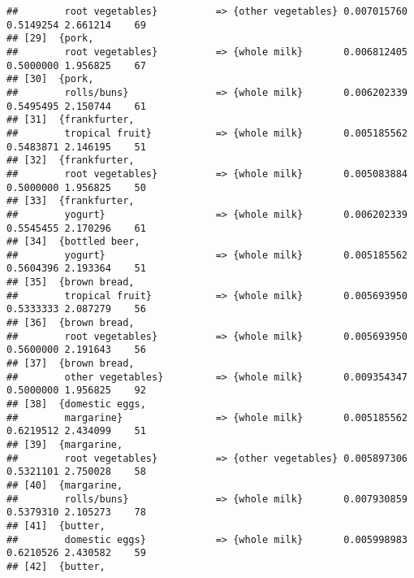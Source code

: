 \documentclass[]{article}
\begin{document}
\begin{verbatim}
##        root vegetables}          => {other vegetables} 0.007015760  0.5149254 2.661214    69
## [29]  {pork,                                                                                
##        root vegetables}          => {whole milk}       0.006812405  0.5000000 1.956825    67
## [30]  {pork,                                                                                
##        rolls/buns}               => {whole milk}       0.006202339  0.5495495 2.150744    61
## [31]  {frankfurter,                                                                         
##        tropical fruit}           => {whole milk}       0.005185562  0.5483871 2.146195    51
## [32]  {frankfurter,                                                                         
##        root vegetables}          => {whole milk}       0.005083884  0.5000000 1.956825    50
## [33]  {frankfurter,                                                                         
##        yogurt}                   => {whole milk}       0.006202339  0.5545455 2.170296    61
## [34]  {bottled beer,                                                                        
##        yogurt}                   => {whole milk}       0.005185562  0.5604396 2.193364    51
## [35]  {brown bread,                                                                         
##        tropical fruit}           => {whole milk}       0.005693950  0.5333333 2.087279    56
## [36]  {brown bread,                                                                         
##        root vegetables}          => {whole milk}       0.005693950  0.5600000 2.191643    56
## [37]  {brown bread,                                                                         
##        other vegetables}         => {whole milk}       0.009354347  0.5000000 1.956825    92
## [38]  {domestic eggs,                                                                       
##        margarine}                => {whole milk}       0.005185562  0.6219512 2.434099    51
## [39]  {margarine,                                                                           
##        root vegetables}          => {other vegetables} 0.005897306  0.5321101 2.750028    58
## [40]  {margarine,                                                                           
##        rolls/buns}               => {whole milk}       0.007930859  0.5379310 2.105273    78
## [41]  {butter,                                                                              
##        domestic eggs}            => {whole milk}       0.005998983  0.6210526 2.430582    59
## [42]  {butter,                                                                              

\end{verbatim}
\end{document}
